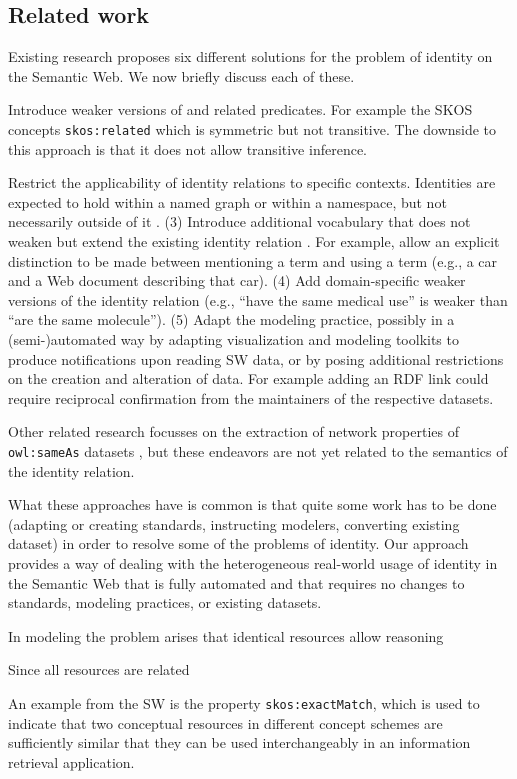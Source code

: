 \subsection{Related work}
\label{sec:related_work}

Existing research proposes six different solutions for
the problem of identity on the Semantic Web.
We now briefly discuss each of these.

Introduce weaker versions of  and related predicates.
  \cite{halpin_hayes_2010,mccusker_mcguinness_2010}
For example the SKOS concepts \texttt{skos:related}
  which is symmetric but not transitive.
The downside to this approach is that it does not allow transitive inference.

Restrict the applicability of identity relations to specific contexts.
  Identities are expected to hold within a named graph or within a namespace,
  but not necessarily outside of it \cite{halpin_hayes_2010,melo_2013}.
(3) Introduce additional vocabulary that does not weaken but extend
  the existing identity relation \cite{halpin_hayes_2010}.
  For example, allow an explicit distinction to be made between mentioning
  a term and using a term
  (e.g., a car and a Web document describing that car).
(4) Add domain-specific weaker versions of the identity relation
  \cite{mccusker_mcguinness_2010} (e.g., ``have the same medical use''
  is weaker than ``are the same molecule'').
(5) Adapt the modeling practice, possibly in a (semi-)automated way
  by adapting visualization and modeling toolkits to produce notifications
  upon reading SW data, or by posing additional restrictions on the creation
  and alteration of data. For example adding an RDF link could require
  reciprocal confirmation from the maintainers of the respective datasets.
  \cite{halpin_hayes_2010,ding_shinavier_finin_mcguinness_2010}

Other related research focusses on the extraction of network properties of
  \verb|owl:sameAs| datasets \cite{ding_shinavier_shangguan_mcguinness_2010},
  but these endeavors are not yet related to the semantics of the
  identity relation.

What these approaches have is common is that quite some work has to be done
  (adapting or creating standards, instructing modelers, converting existing
  dataset) in order to resolve some of the problems of identity.
Our approach provides a way of dealing with the heterogeneous real-world usage
  of identity in the Semantic Web that is fully automated and that requires
  no changes to standards, modeling practices, or existing datasets.

In modeling the problem arises that identical resources allow reasoning

Since all resources are related

An example from the SW is the property \verb|skos:exactMatch|,
which is used to indicate that two conceptual resources in
different concept schemes are sufficiently similar that
they can be used interchangeably
in an information retrieval application.

